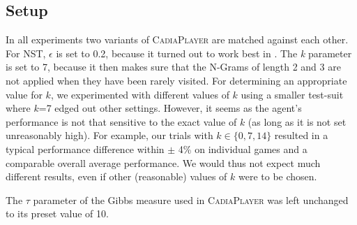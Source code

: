 \documentclass[journal]{IEEEtran}
\begin{document}
\subsection{Setup}
\label{subsec:setup}
In all experiments two variants of \textsc{CadiaPlayer} are matched against each other. For NST, $\epsilon$ is set to 0.2, because it turned out to work best in \cite{ngramArticle}. The \textit{k} parameter is set to 7, because it then makes sure that the N-Grams of length 2 and 3 are not applied when they have been rarely visited. 
For determining an appropriate value for $k$, we experimented with different values of $k$ using a smaller test-suit where $k$=7 edged out other settings. However, it seems as the agent's performance is not that sensitive to the exact value of $k$ (as long as it is not set unreasonably high).  For example, our trials with $k \in \{0, 7, 14\}$ resulted in a typical performance difference within $\pm$ 4\% on individual games and a comparable overall average performance.  We would thus not expect much different results, even if other (reasonable) values of $k$ were to be chosen.

The $\tau$ parameter of the Gibbs measure used in \textsc{CadiaPlayer} was left unchanged to its preset value of 10. 


\end{document}
